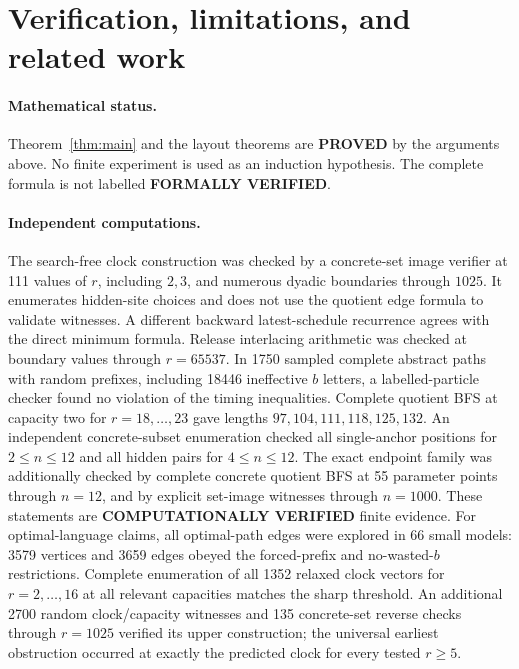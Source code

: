 \documentclass[11pt]{article}
\begin{document}
\section{Verification, limitations, and related work}
\paragraph{Mathematical status.}
Theorem~\ref{thm:main} and the layout theorems are \textbf{PROVED} by the
arguments above. No finite experiment is used as an induction hypothesis.
The complete formula is not labelled \textbf{FORMALLY VERIFIED}.
\paragraph{Independent computations.}
The search-free clock construction was checked by a concrete-set image
verifier at 111 values of $r$, including $2,3$, and numerous dyadic
boundaries through $1025$. It enumerates hidden-site choices and does not
use the quotient edge formula to validate witnesses. A different backward
latest-schedule recurrence agrees with the direct minimum formula.
Release interlacing arithmetic was checked at boundary values through
$r=65537$. In 1750 sampled complete abstract paths with random prefixes,
including 18446 ineffective $b$ letters, a labelled-particle checker found
no violation of the timing inequalities. Complete quotient BFS at
capacity two for $r=18,\ldots,23$ gave lengths $97,104,111,118,125,132$.
An independent concrete-subset enumeration checked all single-anchor
positions for $2\le n\le12$ and all hidden pairs for $4\le n\le12$.
The exact endpoint family was additionally checked by complete concrete
quotient BFS at 55 parameter points through $n=12$, and by explicit
set-image witnesses through $n=1000$.
These statements are \textbf{COMPUTATIONALLY VERIFIED} finite evidence.
For optimal-language claims, all optimal-path edges were explored in
66 small models: 3579 vertices and 3659 edges obeyed the forced-prefix
and no-wasted-$b$ restrictions. Complete enumeration of all 1352 relaxed
clock vectors for $r=2,\ldots,16$ at all relevant capacities matches the
sharp threshold. An additional 2700 random clock/capacity witnesses and
135 concrete-set reverse checks through $r=1025$ verified its upper
construction; the universal earliest obstruction occurred at exactly
the predicted clock for every tested $r\ge5$.
\end{document}
